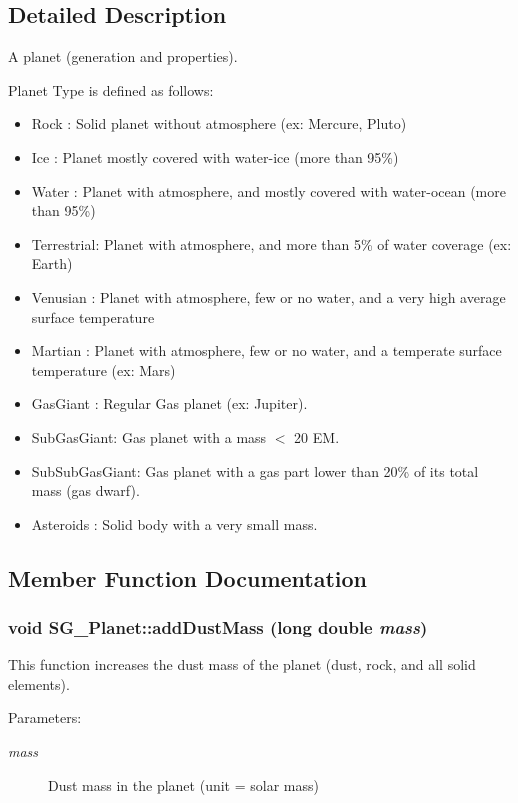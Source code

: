\subsection{Detailed Description}
A planet (generation and properties). 

Planet Type is defined as follows:\begin{itemize}
\item Rock : Solid planet without atmosphere (ex: Mercure, Pluto)\item Ice : Planet mostly covered with water-ice (more than 95\%)\item Water : Planet with atmosphere, and mostly covered with water-ocean (more than 95\%)\item Terrestrial: Planet with atmosphere, and more than 5\% of water coverage (ex: Earth)\item Venusian : Planet with atmosphere, few or no water, and a very high average surface temperature\item Martian : Planet with atmosphere, few or no water, and a temperate surface temperature (ex: Mars)\item Gas\-Giant : Regular Gas planet (ex: Jupiter).\item Sub\-Gas\-Giant: Gas planet with a mass $<$ 20 EM.\item Sub\-Sub\-Gas\-Giant: Gas planet with a gas part lower than 20\% of its total mass (gas dwarf).\item Asteroids : Solid body with a very small mass. \end{itemize}




\subsection{Member Function Documentation}
\subsubsection{\setlength{\rightskip}{0pt plus 5cm}void SG\_\-Planet::add\-Dust\-Mass (long double {\em mass})}\label{class_s_g___planet_a10}


This function increases the dust mass of the planet (dust, rock, and all solid elements). 

\begin{Desc}
\item[Parameters:]
\begin{description}
\item[{\em mass}]Dust mass in the planet (unit = solar mass) \end{description}
\end{Desc}
